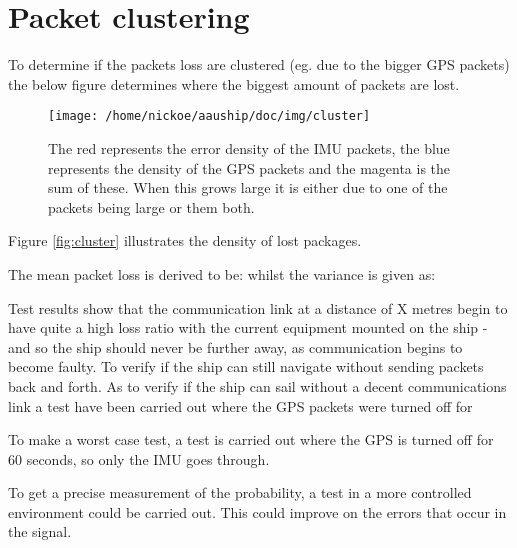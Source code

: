 \section{Packet clustering}
To determine if the packets loss are clustered (eg. due to the bigger GPS packets) the below figure determines where the biggest amount of packets are lost. 

\begin{figure}[htbp]
		\begin{center}
			\texttt{[image: /home/nickoe/aauship/doc/img/cluster]}
			\caption{The red represents the error density of the IMU packets, the blue represents the density of the GPS packets and the magenta is the sum of these. When this grows large it is either due to one of the packets being large or them both. }
			\label{fig:cluster}
		\end{center}
\end{figure}

Figure \vref{fig:cluster} illustrates the density of lost packages. 

The mean packet loss is derived to be: whilst the variance is given as: 

Test results show that the communication link at a distance of X metres begin to have quite a high loss ratio with the current equipment mounted on the ship - and so the ship should never be further away, as communication begins to become faulty. To verify if the ship can still navigate without sending packets back and forth. As to verify if the ship can sail without a decent communications link a test have been carried out where the GPS packets were turned off for 

To make a worst case test, a test is carried out where the GPS is turned off for 60 seconds, so only the IMU goes through. 

To get a precise measurement of the probability, a test in a more controlled environment could be carried out. This could improve on the errors that occur in the signal. 
